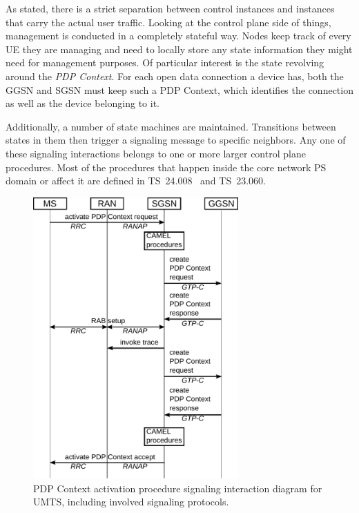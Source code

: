 As stated, there is a strict separation between control instances and instances that carry the actual user traffic. Looking at the control plane side of things, management is conducted in a completely stateful way. Nodes keep track of every \gls{UE} they are managing and need to locally store any state information they might need for management purposes. Of particular interest is the state revolving around the \textit{\gls{PDP} Context}. For each open data connection a device has, both the \gls{GGSN} and \gls{SGSN} must keep such a \gls{PDP} Context, which identifies the connection as well as the device belonging to it.

Additionally, a number of state machines are maintained. Transitions between states in them then trigger a signaling message to specific neighbors. Any one of these signaling interactions belongs to one or more larger control plane procedures. Most of the procedures that happen inside the core network \gls{PS} domain or affect it are defined in \gls{TS}~24.008~\cite{3gpp.24.008} and \gls{TS}~23.060\cite{3gpp.23.060}.

\begin{figure}[htbp]
	\centering
	\includegraphics[width=0.7\textwidth]{images/pdp-context-activation-procedure.pdf}
	\caption{\acrshort{PDP} Context activation procedure signaling interaction diagram for \acrshort{UMTS}, including involved signaling protocols.}
\label{c4:fig:pdpcontextactivationinteraction}
\end{figure}

